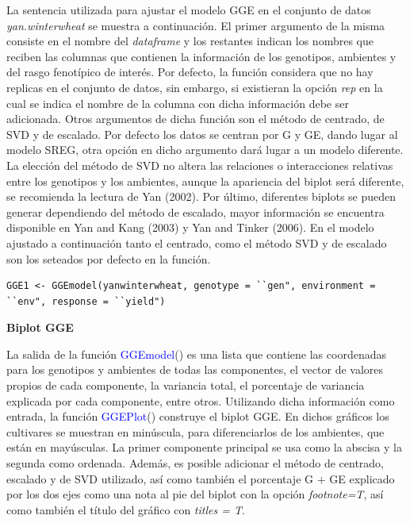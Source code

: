 La sentencia utilizada para ajustar el modelo GGE en el conjunto de datos \emph{yan.winterwheat} se muestra a continuación. El primer argumento de la misma consiste en el nombre del \emph{dataframe} y los restantes indican los nombres que reciben las columnas que contienen la información de los genotipos, ambientes y del rasgo fenotípico de interés. Por defecto, la función considera que no hay replicas en el conjunto de datos, sin embargo, si existieran la opción \emph{rep} en la cual se indica el nombre de la columna con dicha información debe ser adicionada. Otros argumentos de dicha función son el método de centrado, de SVD y de escalado. Por defecto los datos se centran por G y GE, dando lugar al modelo SREG, otra opción en dicho argumento dará lugar a un modelo diferente. La elección del método de SVD no altera las relaciones o interacciones relativas entre los genotipos y los ambientes, aunque la apariencia del biplot será diferente, se recomienda la lectura de Yan (2002). Por último, diferentes biplots se pueden generar dependiendo del método de escalado, mayor información se encuentra disponible en Yan and Kang (2003) y Yan and Tinker (2006). En el modelo ajustado a continuación tanto el centrado, como el método SVD y de escalado son los seteados por defecto en la función.

\begin{tcolorbox}[colframe=aurometalsaurus,colback=backcolour,colbacklower=white,
   				width=1\linewidth,
    			height=0.1\linewidth,
    			boxsep=-3mm]
\begin{lstlisting}
GGE1 <- GGEmodel(yanwinterwheat, genotype = ``gen", environment = ``env", response = ``yield")
\end{lstlisting}
\end{tcolorbox}


\textbf{Biplot GGE}

La salida de la función \textcolor{blue}{GGEmodel}() es una lista que contiene las coordenadas para los genotipos y ambientes de todas las componentes, el vector de valores propios de cada componente, la variancia total, el porcentaje de variancia explicada por cada componente, entre otros. Utilizando dicha información como entrada, la función \textcolor{blue}{GGEPlot}() construye el biplot GGE. En dichos gráficos los cultivares se muestran en minúscula, para diferenciarlos de los ambientes, que están en mayúsculas. La primer componente principal se usa como la abscisa y la segunda como ordenada. Además, es posible adicionar el método de centrado, escalado y de SVD utilizado, así como también el porcentaje G + GE explicado por los dos ejes como una nota al pie del biplot con la opción \emph{footnote=T}, así como también el título del gráfico con \emph{titles = T}. 


